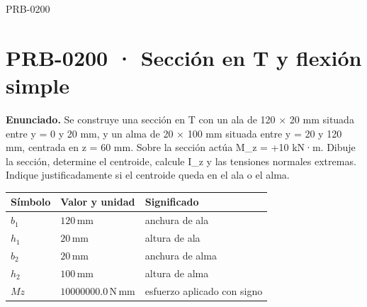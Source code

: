 \begin{studiumworked}{PRB-0200}

\section{PRB-0200 · Sección en T y flexión simple}

\textbf{Enunciado.} Se construye una sección en T con un ala de 120 \ensuremath{\times} 20 mm situada entre y = 0 y 20 mm, y un alma de 20 \ensuremath{\times} 100 mm situada entre y = 20 y 120 mm, centrada en z = 60 mm. Sobre la sección actúa M\_z = +10 kN·m. Dibuje la sección, determine el centroide, calcule I\_z y las tensiones normales extremas. Indique justificadamente si el centroide queda en el ala o el alma.

\par\medskip\noindent\begin{tabular}{@{}p{.18\linewidth}p{.26\linewidth}p{.48\linewidth}@{}}
\toprule Símbolo & Valor y unidad & Significado\\\midrule
$b_{1}$ & $120\,\mathrm{mm}$ & anchura de ala\\
$h_{1}$ & $20\,\mathrm{mm}$ & altura de ala\\
$b_{2}$ & $20\,\mathrm{mm}$ & anchura de alma\\
$h_{2}$ & $100\,\mathrm{mm}$ & altura de alma\\
$Mz$ & $10000000.0\,\mathrm{N\,mm}$ & esfuerzo aplicado con signo\\
\bottomrule\end{tabular}\par\medskip


\end{studiumworked}
